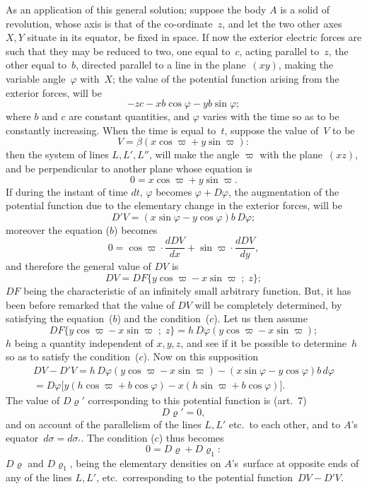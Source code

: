 \documentclass[11pt,notitlepage]{amsart}
\renewcommand{\rho}{\varrho}
\renewcommand{\phi}{\varphi}
\begin{document}
As an application of this general solution; suppose the body $A$ is a
solid of revolution, whose axis is that of the co-ordinate~$z$, and let the two
other axes~$X,Y$ situate in its equator, be fixed in space. If now the exterior
electric forces are such that they may be reduced to two, one equal
to~$c$, acting parallel to~$z$,
the other equal to~$b$, directed parallel to a line in
the plane~$(xy)$, making the variable angle~$\phi$ with~$X$;
the value of the potential function arising
from the exterior forces, will be
\[
-zc-xb\cos\phi-yb\sin\phi;
\]
where $b$ and $c$ are constant quantities,
and $\phi$ varies with the time so as to
be constantly increasing. When the time is equal to~$t$, suppose the value
of~$V$ to be
\[
V=\beta(x\cos\varpi+y\sin\varpi):
\]
then the system of lines $L, L', L''$,
will make the angle $\varpi$ with the plane~$(xz)$,
and be perpendicular to another plane whose equation is
\[
0=x\cos\varpi+y\sin\varpi.
\]
If during the instant of time $dt$, $\phi$ becomes $\phi+D\phi$,
the augmentation of
the potential function due to the elementary change in the exterior forces,
will be
\[
D'V = (x\sin\phi-y\cos\phi)b\,D\phi;
\]
moreover the equation ($b$) becomes
\[
\tag{$b'$.}
0=\cos\varpi\cdot\frac{dDV}{dx}+\sin\varpi\cdot\frac{dDV}{dy},
\]
and therefore the general value of $DV$ is
\[
DV=DF\{y\cos\varpi-x\sin\varpi\;;\;z\};
\]
$DF$ being the characteristic of an infinitely small arbitrary function. But, it
has been before remarked that the value of $DV$ will be completely determined,
by satisfying the equation~($b$) and the condition~($c$). Let us then assume
\[
DF\{y\cos\varpi-x\sin\varpi\;;\;z\}=h\,D\phi(y\cos\varpi-x\sin\varpi);
\]
$h$ being a quantity independent of $x,y,z$, and see if it be possible to 
determine~$h$ so as to satisfy the condition~($c$). Now on this supposition
\begin{multline*}
DV-D'V=h\,D\phi(y\cos\varpi-x\sin\varpi)-(x\sin\phi-y\cos\phi)b\,d\phi\\
=D\phi\bigl[y(h\cos\varpi+b\cos\phi)-x(h\sin\varpi+b\cos\phi)\bigr].
\end{multline*}
The value of $D\rho'$ corresponding to this potential function
is (art.~7)
\[
D\rho'=0,
\]
and on account of the parallelism of the lines $L,L'$ etc.\ to each other, and
to $A$'s equator~$d\sigma=d\sigma_\prime$. The condition ($c$) thus becomes
\[
\tag{$c'$.}
0=D\rho+D\rho_1:
\]
$D\rho$ and $D\rho_1$,
being the elementary densities on $A$'s~surface at opposite ends
of any of the lines $L,L'$, etc.\ 
corresponding to the potential function~${DV-D'V}$.
\end{document}
